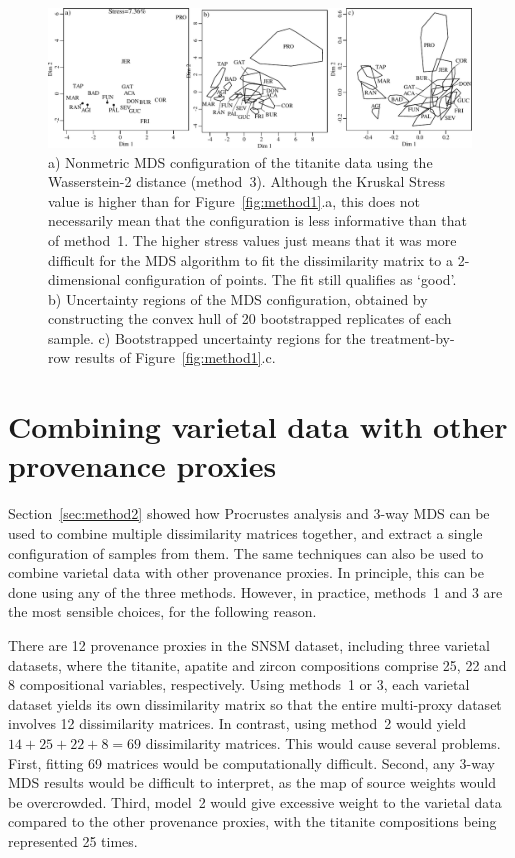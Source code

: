 \documentclass{article}
\begin{document}
\begin{figure}
\includegraphics[height=.7\textheight]{Fig4.pdf}
\caption{a) Nonmetric MDS configuration of the titanite data using the
  Wasserstein-2 distance (method~3). Although the Kruskal Stress value
  is higher than for Figure~\ref{fig:method1}.a, this does not
  necessarily mean that the configuration is less informative than
  that of method~1. The higher stress values just means that it was
  more difficult for the MDS algorithm to fit the dissimilarity matrix
  to a 2-dimensional configuration of points.  The fit still qualifies
  as `good'. b) Uncertainty regions of the MDS configuration, obtained
  by constructing the convex hull of 20 bootstrapped replicates of
  each sample. c) Bootstrapped uncertainty regions for the
  treatment-by-row results of Figure~\ref{fig:method1}.c.}
\label{fig:method3}
\end{figure}

\section{Combining varietal data with other provenance proxies}\label{sec:3way}

Section~\ref{sec:method2} showed how Procrustes analysis and 3-way MDS
can be used to combine multiple dissimilarity matrices together, and
extract a single configuration of samples from them. The same
techniques can also be used to combine varietal data with other
provenance proxies.  In principle, this can be done using any of the
three methods. However, in practice, methods~1 and 3 are the most
sensible choices, for the following reason.\medskip

There are 12 provenance proxies in the SNSM dataset, including three
varietal datasets, where the titanite, apatite and zircon compositions
comprise 25, 22 and 8 compositional variables, respectively.  Using
methods~1 or 3, each varietal dataset yields its own dissimilarity
matrix so that the entire multi-proxy dataset involves 12
dissimilarity matrices. In contrast, using method~2 would yield
$14+25+22+8=69$ dissimilarity matrices. This would cause several
problems. First, fitting 69 matrices would be computationally
difficult. Second, any 3-way MDS results would be difficult to
interpret, as the map of source weights would be overcrowded. Third,
model~2 would give excessive weight to the varietal data compared to
the other provenance proxies, with the titanite compositions being
represented 25 times.\medskip
\end{document}

